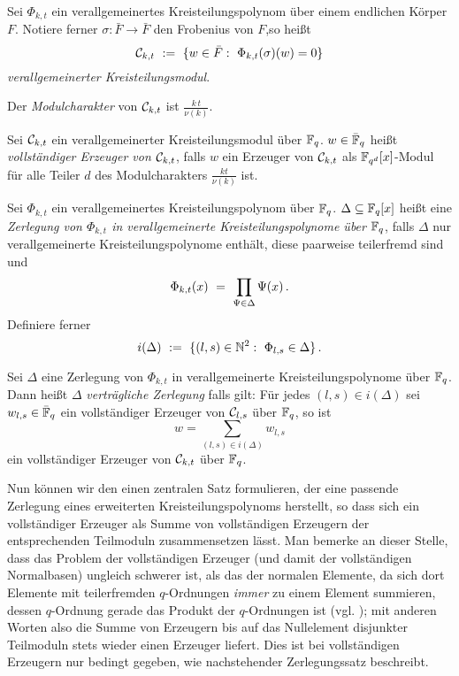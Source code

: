 \begin{definition}
  \label{def:verallgemeinerter_kreisteilungsmodul}
  Sei $\Phi_{k,t}$ ein verallgemeinertes Kreisteilungspolynom über einem
  endlichen Körper $F$. Notiere ferner $\sigma: \bar F\to \bar F$ 
  den Frobenius von $F$,so heißt
  \[ \C_{k,t} \speq{:=} \{ w \in \bar F:\ \Phi_{k,t}(\sigma)(w) = 0 \}\]
  \emph{verallgemeinerter Kreisteilungsmodul}.

  Der \emph{Modulcharakter} von $\mathcal{C}_{k,t}$ ist $\frac{k\,t}{\nu(k)}$.
\end{definition}

\begin{definition}
  \label{def:vollst_erzeuger}
  Sei $\mathcal{C}_{k,t}$ ein verallgemeinerter Kreisteilungsmodul über $\mathbb{F}_q$.
  $w \in \bar {\mathbb{F}}_q$ heißt 
  \emph{vollständiger Erzeuger von $\mathcal{C}_{k,t}$}, falls
  $w$ ein Erzeuger von $\mathcal{C}_{k,t}$ als $\mathbb{F}_{q^d}[x]$-Modul 
  für alle Teiler $d$ des Modulcharakters $\frac{kt}{\nu(k)}$ ist.
\end{definition}

\begin{definition}
  Sei $\Phi_{k,t}$ ein verallgemeinertes Kreisteilungspolynom über $\mathbb{F}_q$.
  $\Delta \subseteq \mathbb{F}_q[x]$ heißt eine 
  \emph{Zerlegung von $\Phi_{k,t}$ in verallgemeinerte Kreisteilungspolynome
  über $\mathbb{F}_q$}, 
  falls $\Delta$ nur verallgemeinerte Kreisteilungspolynome enthält, diese
  paarweise teilerfremd sind und
  \[ \Phi_{k,t}(x) \ =\  \prod_{\Psi \in \Delta} \Psi(x)\,. \]
  Definiere ferner
  \[ i(\Delta) \speq{:=} \{ (l,s) \in \N^2:\ 
    \Phi_{l,s} \in \Delta\}\,.\]
\end{definition}


\begin{definition}
  \label{def:vertraeglich}
  Sei $\Delta$ eine Zerlegung von $\Phi_{k,t}$ in verallgemeinerte
  Kreisteilungspolynome über $\mathbb{F}_q$.
  Dann heißt $\Delta$ 
  \emph{verträgliche Zerlegung} falls gilt: Für jedes 
  $(l,s) \in i(\Delta)$ sei
  $w_{l,s} \in \bar {\mathbb{F}}_q$ ein vollständiger Erzeuger von 
  $\mathcal{C}_{l,s}$ über $\mathbb{F}_q$,
  so ist 
  \[ w = \sum_{(l,s) \in i(\Delta)} w_{l,s} \]
  ein vollständiger Erzeuger von $\mathcal{C}_{k,t}$ über $\mathbb{F}_q$.
\end{definition}


Nun können wir den einen zentralen Satz formulieren, der eine passende
Zerlegung eines erweiterten Kreisteilungspolynoms herstellt, so dass sich ein
vollständiger Erzeuger als Summe von vollständigen Erzeugern der entsprechenden
Teilmoduln zusammensetzen lässt. Man bemerke an dieser Stelle, dass das Problem
der vollständigen Erzeuger (und damit der vollständigen Normalbasen) ungleich
schwerer ist, als das der normalen Elemente, da sich dort Elemente 
mit teilerfremden $q$-Ordnungen \emph{immer} zu einem Element summieren, dessen
$q$-Ordnung gerade das Produkt der $q$-Ordnungen ist 
(vgl. ); mit anderen Worten 
also die Summe von Erzeugern bis auf das Nullelement disjunkter 
Teilmoduln stets wieder einen Erzeuger
liefert. Dies ist bei vollständigen Erzeugern nur bedingt gegeben, wie
nachstehender Zerlegungssatz beschreibt.

